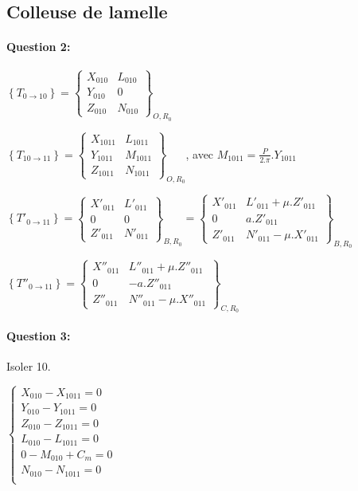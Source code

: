 \subsection{Colleuse de lamelle}

\paragraph{Question 2:} 

$\left\{T_{0\rightarrow 10}\right\}=\left\{
\begin{array}{cc}
X_{010} & L_{010} \\
Y_{010} & 0 \\
Z_{010} & N_{010}
\end{array}
\right\}_{O,R_0}$

$\left\{T_{10\rightarrow 11}\right\}=\left\{
\begin{array}{cc}
X_{1011} & L_{1011} \\
Y_{1011} & M_{1011} \\
Z_{1011} & N_{1011}
\end{array}
\right\}_{O,R_0}$, avec $M_{1011}=\frac{P}{2.\pi}.Y_{1011}$

$\left\{T'_{0\rightarrow 11}\right\}=\left\{
\begin{array}{cc}
X'_{011} & L'_{011} \\
0 & 0 \\
Z'_{011} & N'_{011}
\end{array}
\right\}_{B,R_0}=\left\{
\begin{array}{cc}
X'_{011} & L'_{011}+\mu.Z'_{011} \\
0 & a.Z'_{011} \\
Z'_{011} & N'_{011}-\mu.X'_{011}
\end{array}
\right\}_{B,R_0}$

$\left\{T''_{0\rightarrow 11}\right\}=\left\{
\begin{array}{cc}
X''_{011} & L''_{011}+\mu.Z''_{011} \\
0 & -a.Z''_{011} \\
Z''_{011} & N''_{011}-\mu.X''_{011}
\end{array}
\right\}_{C,R_0}$


\paragraph{Question 3:}

Isoler 10.

$\left\{\begin{array}{l}
X_{010}-X_{1011}=0 \\
Y_{010}-Y_{1011}=0 \\
Z_{010}-Z_{1011}=0 \\
L_{010}-L_{1011}=0 \\
0-M_{010}+C_m=0  \\
N_{010}-N_{1011}=0 \\
\end{array}\right.$

